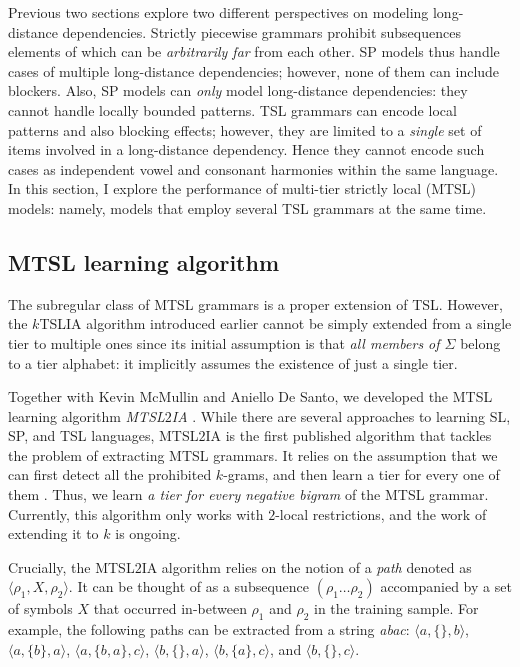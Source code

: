 Previous two sections explore two different perspectives on modeling long-distance dependencies.
Strictly piecewise grammars prohibit subsequences elements of which can be \emph{arbitrarily far} from each other.
SP models thus handle cases of multiple long-distance dependencies; however, none of them can include blockers.
Also, SP models can \emph{only} model long-distance dependencies: they cannot handle locally bounded patterns.
TSL grammars can encode local patterns and also blocking effects; however, they are limited to a \emph{single} set of items involved in a long-distance dependency.
Hence they cannot encode such cases as independent vowel and consonant harmonies within the same language.
In this section, I explore the performance of multi-tier strictly local (MTSL) models: namely, models that employ several TSL grammars at the same time.



\subsection{MTSL learning algorithm}
\label{mtsllearner}

The subregular class of MTSL grammars is a proper extension of TSL.
However, the $k$TSLIA algorithm introduced earlier cannot be simply extended from a single tier to multiple ones since its initial assumption is that \emph{all members of $\Sigma$} belong to a tier alphabet: it implicitly assumes the existence of just a single tier.

Together with Kevin McMullin and Aniello De Santo, we developed the MTSL learning algorithm \emph{MTSL$2$IA} \citep{McMullinAksenovaDeSanto2019}.
While there are several approaches to learning SL, SP, and TSL languages, MTSL$2$IA is the first published algorithm that tackles the problem of extracting MTSL grammars.
It relies on the assumption that we can first detect all the prohibited $k$-grams, and then learn a tier for every one of them .
Thus, we learn \emph{a tier for every negative bigram} of the MTSL grammar.
Currently, this algorithm only works with $2$-local restrictions, and the work of extending it to $k$ is ongoing.

Crucially, the MTSL$2$IA algorithm relies on the notion of a \emph{path} denoted as $\langle\rho_1, X, \rho_2\rangle$.
It can be thought of as a subsequence $(\rho_1\dots\rho_2)$ accompanied by a set of symbols $X$ that occurred in-between $\rho_1$ and $\rho_2$ in the training sample. For example, the following paths can be extracted from a string \emph{abac}:
$\langle a, \{\}, b \rangle$,
$\langle a, \{b\}, a \rangle$,
$\langle a, \{b, a\}, c \rangle$,
$\langle b, \{\}, a \rangle$,
$\langle b, \{a\}, c \rangle$, and 
$\langle b, \{\}, c \rangle$.


